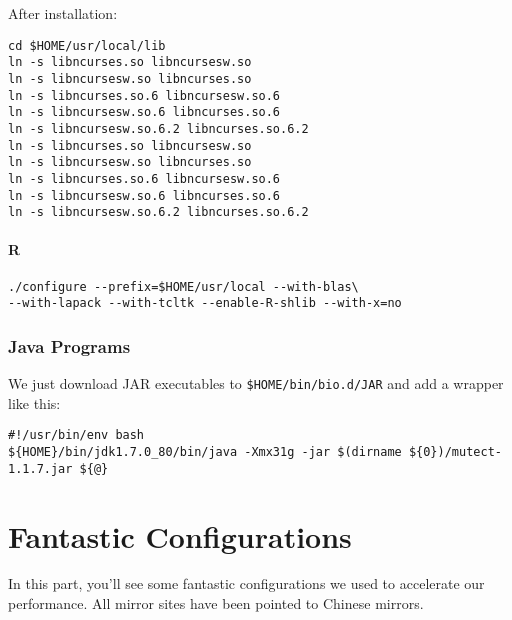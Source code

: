 \documentclass[]{article}
\begin{document}
After installation:

\begin{verbatim}
cd $HOME/usr/local/lib
ln -s libncurses.so libncursesw.so
ln -s libncursesw.so libncurses.so
ln -s libncurses.so.6 libncursesw.so.6
ln -s libncursesw.so.6 libncurses.so.6
ln -s libncursesw.so.6.2 libncurses.so.6.2
ln -s libncurses.so libncursesw.so
ln -s libncursesw.so libncurses.so
ln -s libncurses.so.6 libncursesw.so.6
ln -s libncursesw.so.6 libncurses.so.6
ln -s libncursesw.so.6.2 libncurses.so.6.2
\end{verbatim}

\subsection{R}
\begin{verbatim}
./configure --prefix=$HOME/usr/local --with-blas\
--with-lapack --with-tcltk --enable-R-shlib --with-x=no
\end{verbatim}

\section{Java Programs}

We just download JAR executables to \verb|$HOME/bin/bio.d/JAR| and add a wrapper like this:

\begin{verbatim}
#!/usr/bin/env bash
${HOME}/bin/jdk1.7.0_80/bin/java -Xmx31g -jar $(dirname ${0})/mutect-1.1.7.jar ${@}
\end{verbatim}

\part{Fantastic Configurations}
In this part, you'll see some fantastic configurations we used to accelerate our performance. All mirror sites have been pointed to Chinese mirrors.
\end{document}
